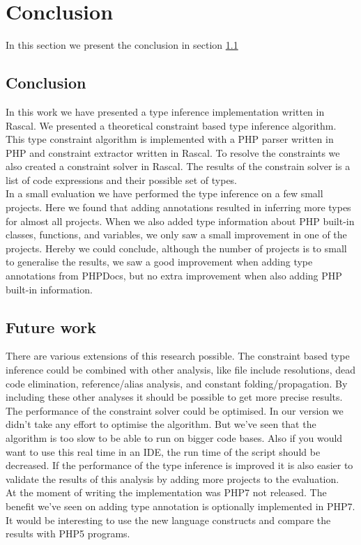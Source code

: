 \documentclass[main.tex]{subfiles}
\begin{document}
    \chapter{Conclusion}\label{ch:conclusion}
    In this section we present the conclusion in section \ref{conclusion:conclusion}
    
    \section{Conclusion}\label{conclusion:conclusion}
    In this work we have presented a type inference implementation written in Rascal.
    We presented a theoretical constraint based type inference algorithm.
    This type constraint algorithm is implemented with a PHP parser written in PHP and constraint extractor written in Rascal.
    To resolve the constraints we also created a constraint solver in Rascal.
    The results of the constrain solver is a list of code expressions and their possible set of types.
    \\
    In a small evaluation we have performed the type inference on a few small projects.
    Here we found that adding annotations resulted in inferring more types for almost all projects.
    When we also added type information about PHP built-in classes, functions, and variables, we only saw a small improvement in one of the projects.
    Hereby we could conclude, although the number of projects is to small to generalise the results, we saw a good improvement when adding type annotations from PHPDocs, but no extra improvement when also adding PHP built-in information.
    
    \section{Future work}\label{conclusion:future-work}
    There are various extensions of this research possible.
    The constraint based type inference could be combined with other analysis, like file include resolutions, dead code elimination, reference/alias analysis, and constant folding/propagation.
    By including these other analyses it should be possible to get more precise results.
    \\
    The performance of the constraint solver could be optimised.
    In our version we didn't take any effort to optimise the algorithm.
    But we've seen that the algorithm is too slow to be able to run on bigger code bases.
    Also if you would want to use this real time in an IDE, the run time of the script should be decreased.
    If the performance of the type inference is improved it is also easier to validate the results of this analysis by adding more projects to the evaluation.
    \\
    At the moment of writing the implementation was PHP7 not released.
    The benefit we've seen on adding type annotation is optionally implemented in PHP7.
    It would be interesting to use the new language constructs and compare the results with PHP5 programs.
    
\end{document}
